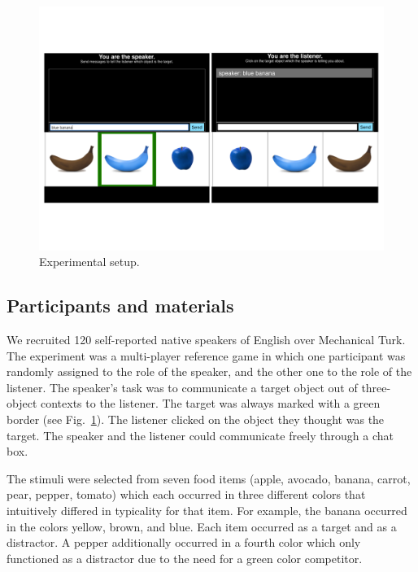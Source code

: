 \documentclass[10pt,letterpaper]{article}
\newcommand{\figref}[1]{Fig.~\ref{#1}}
\begin{document}
\begin{figure}[bt!]
	\centering
	\includegraphics[width=.5\textwidth]{graphs/design_0}
	\caption{Experimental setup.
	}
	\label{fig:mturk}
\end{figure}


\subsection{Participants and materials}
We recruited 120 self-reported native speakers of English over Mechanical Turk. The experiment was a multi-player reference game in which one participant was randomly assigned to the role of the speaker, and the other one to the role of the listener. The speaker's task was to communicate a target object out of three-object contexts to the listener. The target was always marked with a green border (see \figref{fig:mturk}). The listener clicked on the object they thought was the target. The speaker and the listener could communicate freely through a chat box.

The stimuli were selected from seven food items (apple, avocado, banana, carrot, pear, pepper, tomato) which each occurred in three different colors that intuitively differed in typicality for that item. For example, the banana occurred in the colors yellow, brown, and blue. Each item occurred as a target and as a distractor. A pepper additionally occurred in a fourth color which only functioned as a distractor due to the need for a green color competitor.
\end{document}

